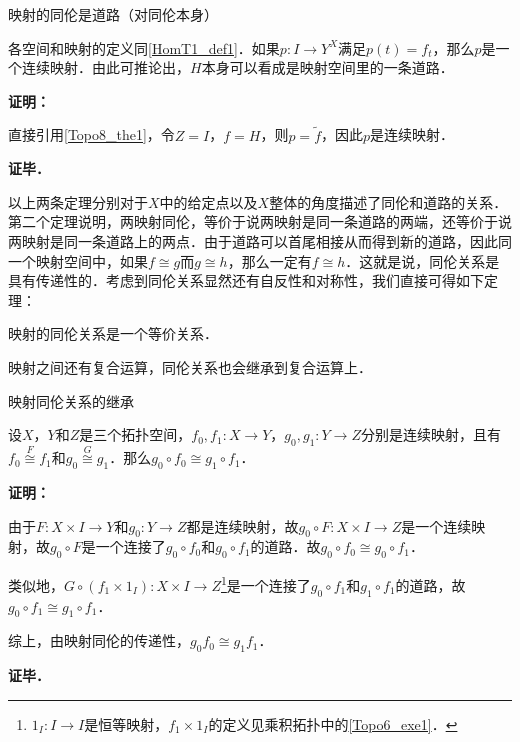 \begin{theorem}{映射的同伦是道路（对同伦本身）}\label{HomT1_the1}

各空间和映射的定义同\autoref{HomT1_def1}．如果$p:I\rightarrow Y^X$满足$p(t)=f_t$，那么$p$是一个连续映射．由此可推论出，$H$本身可以看成是映射空间里的一条道路．

\end{theorem}

\textbf{证明：}

直接引用\autoref{Topo8_the1}，令$Z=I$，$f=H$，则$p=\widetilde{f}$，因此$p$是连续映射．

\textbf{证毕．}

以上两条定理分别对于$X$中的给定点以及$X$整体的角度描述了同伦和道路的关系．第二个定理说明，两映射同伦，等价于说两映射是同一条道路的两端，还等价于说两映射是同一条道路上的两点．由于道路可以首尾相接从而得到新的道路，因此同一个映射空间中，如果$f\cong g$而$g\cong h$，那么一定有$f\cong h$．这就是说，同伦关系是具有传递性的．考虑到同伦关系显然还有自反性和对称性，我们直接可得如下定理：

\begin{theorem}{}
映射的同伦关系是一个等价关系．
\end{theorem}

映射之间还有复合运算，同伦关系也会继承到复合运算上．

\begin{theorem}{映射同伦关系的继承}

设$X$，$Y$和$Z$是三个拓扑空间，$f_0, f_1:X\rightarrow Y$，$g_0, g_1:Y\rightarrow Z$分别是连续映射，且有$f_0\overset{F}{\cong}f_1$和$g_0\overset{G}{\cong}g_1$．那么$g_0\circ f_0\cong g_1\circ f_1$．

\end{theorem}

\textbf{证明：}

由于$F:X\times I\rightarrow Y$和$g_0:Y\rightarrow Z$都是连续映射，故$g_0\circ F:X\times I\rightarrow Z$是一个连续映射，故$g_0\circ F$是一个连接了$g_0\circ f_0$和$g_0\circ f_1$的道路．故$g_0\circ f_0\cong g_0\circ f_1$．

类似地，$G\circ(f_1\times 1_I):X\times I\rightarrow Z$\footnote{$1_I:I\rightarrow I$是恒等映射，$f_1\times 1_I$的定义见乘积拓扑中的\autoref{Topo6_exe1}．}是一个连接了$g_0\circ f_1$和$g_1\circ f_1$的道路，故$g_0\circ f_1\cong g_1\circ f_1$．

综上，由映射同伦的传递性，$g_0f_0\cong g_1f_1$．

\textbf{证毕．}

